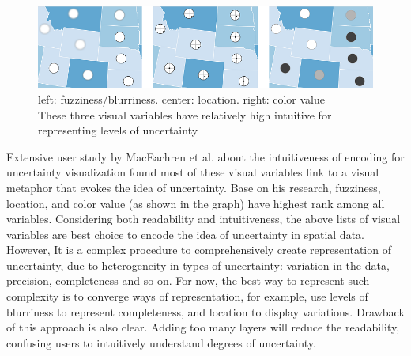 \documentclass[11pt,letterpaper]{article}
\begin{document}
\begin{figure}[h!]
\includegraphics[scale=0.75]{memo_fig3.png}
\caption{left: fuzziness/blurriness. center: location. right: color value \\
These three visual variables have relatively high intuitive for representing levels of uncertainty}
\end{figure}

\noindent Extensive user study by MacEachren et al. about the intuitiveness of encoding for uncertainty visualization found most of these visual variables link to a visual metaphor that evokes the idea of uncertainty. Base on his research, fuzziness, location, and color value (as shown in the graph) have highest rank among all variables. Considering both readability and intuitiveness, the above lists of visual variables are best choice to encode the idea of uncertainty in spatial data. \\


\noindent However, It is a complex procedure to comprehensively create representation of uncertainty, due to heterogeneity in types of uncertainty: variation in the data, precision, completeness and so on. For now, the best way to represent such complexity is to converge ways of representation, for example, use levels of blurriness to represent completeness, and location to display variations. Drawback of this approach is also clear. Adding too many layers will reduce the readability, confusing users to intuitively understand degrees of uncertainty. 
\end{document}
